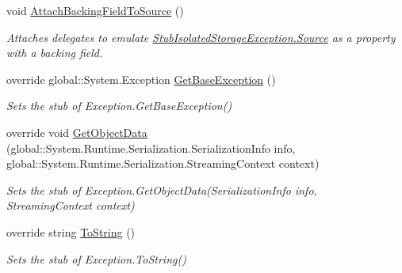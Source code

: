 \begin{DoxyCompactItemize}
void \hyperlink{class_system_1_1_i_o_1_1_isolated_storage_1_1_fakes_1_1_stub_isolated_storage_exception_a0ea406d833261b74c5edf3d6f10a1a2f}{Attach\-Backing\-Field\-To\-Source} ()
\begin{DoxyCompactList}\small\item\em Attaches delegates to emulate \hyperlink{class_system_1_1_i_o_1_1_isolated_storage_1_1_fakes_1_1_stub_isolated_storage_exception_a99a67d0bb42a66d1e4af7c6d9aefe820}{Stub\-Isolated\-Storage\-Exception.\-Source} as a property with a backing field.\end{DoxyCompactList}\item 
override global\-::\-System.\-Exception \hyperlink{class_system_1_1_i_o_1_1_isolated_storage_1_1_fakes_1_1_stub_isolated_storage_exception_a9af89d97168702562e7042dda332a241}{Get\-Base\-Exception} ()
\begin{DoxyCompactList}\small\item\em Sets the stub of Exception.\-Get\-Base\-Exception()\end{DoxyCompactList}\item 
override void \hyperlink{class_system_1_1_i_o_1_1_isolated_storage_1_1_fakes_1_1_stub_isolated_storage_exception_a4f900c12a933d764cc9bc9585a17b29e}{Get\-Object\-Data} (global\-::\-System.\-Runtime.\-Serialization.\-Serialization\-Info info, global\-::\-System.\-Runtime.\-Serialization.\-Streaming\-Context context)
\begin{DoxyCompactList}\small\item\em Sets the stub of Exception.\-Get\-Object\-Data(\-Serialization\-Info info, Streaming\-Context context)\end{DoxyCompactList}\item 
override string \hyperlink{class_system_1_1_i_o_1_1_isolated_storage_1_1_fakes_1_1_stub_isolated_storage_exception_a4f92867ab9e8d56a4d47b73a006d34a2}{To\-String} ()
\begin{DoxyCompactList}\small\item\em Sets the stub of Exception.\-To\-String()\end{DoxyCompactList}\end{DoxyCompactItemize}
